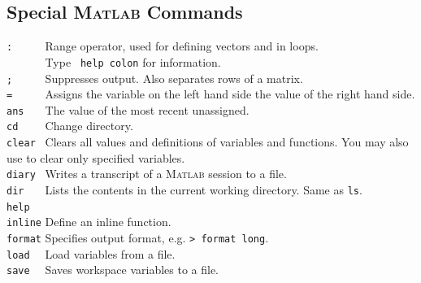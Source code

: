 \subsection*{Special \textsc{Matlab} Commands}
\verb&:     & Range operator, used for defining vectors and in loops.\\
\verb&      & Type \verb& help colon& for information.\\
\verb&;     & Suppresses output. Also separates rows of a matrix.\\
\verb&=     & Assigns the variable on the left hand side the value of
                the right hand side.\\
\verb&ans   & The value of the most recent unassigned.\\
\verb&cd    & Change directory.\\
\verb&clear & Clears all values and definitions of variables and functions. You may
             also use to clear only specified variables.\\
\verb&diary & Writes a transcript of a \textsc{Matlab} session to a file.\\
\verb&dir   & Lists the contents in the current working directory. Same as \verb&ls&.\\
\verb&help  &\\
\verb&inline& Define an inline function.\\
\verb&format& Specifies output format, e.g. \verb&> format long&.\\
\verb&load  & Load variables from a file.\\
\verb&save  & Saves workspace variables to a file.\\




